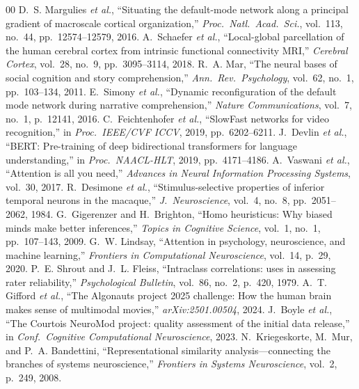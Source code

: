 \documentclass[conference]{IEEEtran}
\begin{document}
\begin{thebibliography}{00}
 D.~S. Margulies \textit{et al.}, ``Situating the default-mode network along a principal gradient of macroscale cortical organization,'' \textit{Proc.~Natl.~Acad.~Sci.}, vol.~113, no.~44, pp.~12574--12579, 2016.
 A.~Schaefer \textit{et al.}, ``Local-global parcellation of the human cerebral cortex from intrinsic functional connectivity MRI,'' \textit{Cerebral Cortex}, vol.~28, no.~9, pp.~3095--3114, 2018.
 R.~A. Mar, ``The neural bases of social cognition and story comprehension,'' \textit{Ann.~Rev.~Psychology}, vol.~62, no.~1, pp.~103--134, 2011.
 E.~Simony \textit{et al.}, ``Dynamic reconfiguration of the default mode network during narrative comprehension,'' \textit{Nature Communications}, vol.~7, no.~1, p.~12141, 2016.
 C.~Feichtenhofer \textit{et al.}, ``SlowFast networks for video recognition,'' in \textit{Proc.~IEEE/CVF ICCV}, 2019, pp.~6202--6211.
 J.~Devlin \textit{et al.}, ``BERT: Pre-training of deep bidirectional transformers for language understanding,'' in \textit{Proc.~NAACL-HLT}, 2019, pp.~4171--4186.
 A.~Vaswani \textit{et al.}, ``Attention is all you need,'' \textit{Advances in Neural Information Processing Systems}, vol.~30, 2017.
 R.~Desimone \textit{et al.}, ``Stimulus-selective properties of inferior temporal neurons in the macaque,'' \textit{J.~Neuroscience}, vol.~4, no.~8, pp.~2051--2062, 1984.
 G.~Gigerenzer and H.~Brighton, ``Homo heuristicus: Why biased minds make better inferences,'' \textit{Topics in Cognitive Science}, vol.~1, no.~1, pp.~107--143, 2009.
 G.~W. Lindsay, ``Attention in psychology, neuroscience, and machine learning,'' \textit{Frontiers in Computational Neuroscience}, vol.~14, p.~29, 2020.
 P.~E. Shrout and J.~L. Fleiss, ``Intraclass correlations: uses in assessing rater reliability,'' \textit{Psychological Bulletin}, vol.~86, no.~2, p.~420, 1979.
 A.~T. Gifford \textit{et al.}, ``The Algonauts project 2025 challenge: How the human brain makes sense of multimodal movies,'' \textit{arXiv:2501.00504}, 2024.
 J.~Boyle \textit{et al.}, ``The Courtois NeuroMod project: quality assessment of the initial data release,'' in \textit{Conf.~Cognitive Computational Neuroscience}, 2023.
 N.~Kriegeskorte, M.~Mur, and P.~A. Bandettini, ``Representational similarity analysis---connecting the branches of systems neuroscience,'' \textit{Frontiers in Systems Neuroscience}, vol.~2, p.~249, 2008.

\end{thebibliography}
\end{document}
